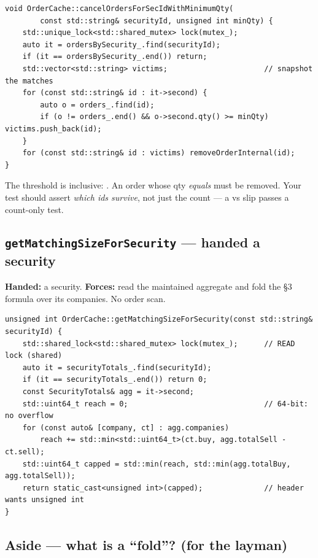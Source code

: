 \begin{lstlisting}
void OrderCache::cancelOrdersForSecIdWithMinimumQty(
        const std::string& securityId, unsigned int minQty) {
    std::unique_lock<std::shared_mutex> lock(mutex_);
    auto it = ordersBySecurity_.find(securityId);
    if (it == ordersBySecurity_.end()) return;
    std::vector<std::string> victims;                      // snapshot the matches
    for (const std::string& id : it->second) {
        auto o = orders_.find(id);
        if (o != orders_.end() && o->second.qty() >= minQty) victims.push_back(id);
    }
    for (const std::string& id : victims) removeOrderInternal(id);
}
\end{lstlisting}

\begin{pitfall}
The threshold is inclusive: . An order whose qty \emph{equals}
 must be removed. Your test should assert \emph{which ids survive},
not just the count --- a \code{>} vs \code{>=} slip passes a count-only test.
\end{pitfall}

\subsection{\texttt{getMatchingSizeForSecurity} --- handed a security}

\textbf{Handed:} a security. \textbf{Forces:} read the maintained aggregate and
fold the \S3 formula over its companies. No order scan.

\begin{lstlisting}
unsigned int OrderCache::getMatchingSizeForSecurity(const std::string& securityId) {
    std::shared_lock<std::shared_mutex> lock(mutex_);      // READ lock (shared)
    auto it = securityTotals_.find(securityId);
    if (it == securityTotals_.end()) return 0;
    const SecurityTotals& agg = it->second;
    std::uint64_t reach = 0;                               // 64-bit: no overflow
    for (const auto& [company, ct] : agg.companies)
        reach += std::min<std::uint64_t>(ct.buy, agg.totalSell - ct.sell);
    std::uint64_t capped = std::min(reach, std::min(agg.totalBuy, agg.totalSell));
    return static_cast<unsigned int>(capped);              // header wants unsigned int
}
\end{lstlisting}

\subsection*{Aside --- what is a ``fold''? (for the layman)}

